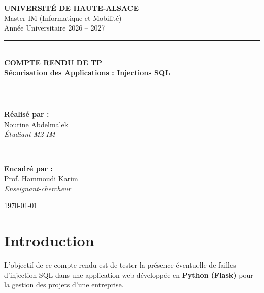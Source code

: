 \documentclass[12pt,a4paper]{article}
\begin{document}
\begin{titlepage}
    \centering
    \vspace*{1cm}
    
    {\Large \textbf{UNIVERSITÉ DE HAUTE-ALSACE}}\\[0.3cm]
    {\large Master IM (Informatique et Mobilité)}\\[0.2cm]
    {\large Année Universitaire 2026 -- 2027}\\[2.5cm]
    
    \rule{\linewidth}{0.5mm}\\[0.5cm]
    {\huge \bfseries COMPTE RENDU DE TP}\\[0.3cm]
    {\Large \textbf{Sécurisation des Applications : Injections SQL}}\\[0.5cm]
    \rule{\linewidth}{0.5mm}\\[3cm]
    
    \begin{minipage}{0.45\textwidth}
        \begin{flushleft} \large
            \textbf{Réalisé par :}\\
            Nourine Abdelmalek\\
            \textit{Étudiant M2 IM}
        \end{flushleft}
    \end{minipage}
    ~
    \begin{minipage}{0.45\textwidth}
        \begin{flushright} \large
            \textbf{Encadré par :}\\
            Prof. Hammoudi Karim\\
            \textit{Enseignant-chercheur}
        \end{flushright}
    \end{minipage}
    
    \vfill
    
    {\large \today}
\end{titlepage}

\newpage
\tableofcontents
\newpage

\section{Introduction}
L'objectif de ce compte rendu est de tester la présence éventuelle de failles d'injection SQL dans une application web développée en \textbf{Python (Flask)} pour la gestion des projets d'une entreprise.
\end{document}
